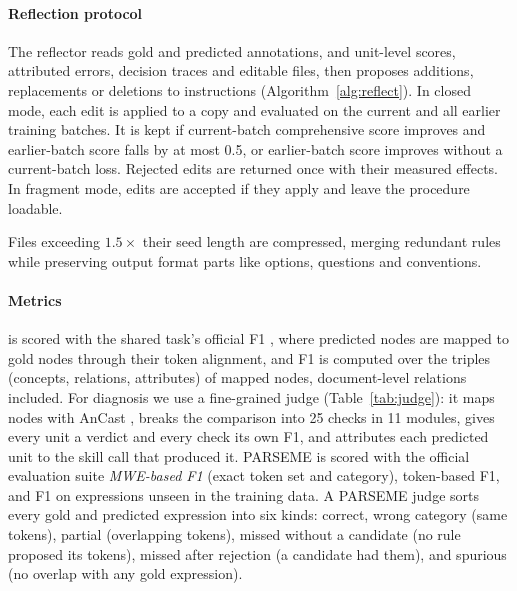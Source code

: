 \paragraph{Reflection protocol}
\label{sec:reflection-protocol}
The reflector reads gold and predicted annotations, and unit-level scores, attributed errors, decision traces and editable files, then proposes additions, replacements or deletions to instructions (Algorithm~\ref{alg:reflect}). In closed mode, each edit is applied to a copy and evaluated on the current and all earlier training batches. It is kept if current-batch comprehensive score improves and earlier-batch score falls by at most 0.5, or earlier-batch score improves without a current-batch loss. Rejected edits are returned once with their measured effects. In fragment mode, edits are accepted if they apply and leave the procedure loadable.

Files exceeding $1.5\times$ their seed length are compressed, merging redundant rules while preserving output format parts like options, questions and conventions.

\paragraph{Metrics}
\label{sec:metrics}
\umr is scored with the shared task's official \jm{} F1 \citep{stepanek2026first}, where predicted nodes are mapped to gold nodes through their token alignment, and F1 is computed over the triples (concepts, relations, attributes) of mapped nodes, document-level relations included. For diagnosis we use a fine-grained judge (Table~\ref{tab:judge}): it maps nodes with AnCast \citep{sun2024ancast}, breaks the comparison into 25 checks in 11 modules, gives every unit a verdict and every check its own F1, and attributes each predicted unit to the skill call that produced it. PARSEME is scored with the official evaluation suite \textit{MWE-based F1} (exact token set and category), token-based F1, and F1 on expressions unseen in the training data. A PARSEME judge sorts every gold and predicted expression into six kinds: correct, wrong category (same tokens), partial (overlapping tokens), missed without a candidate (no rule proposed its tokens), missed after rejection (a candidate had them), and spurious (no overlap with any gold expression).

